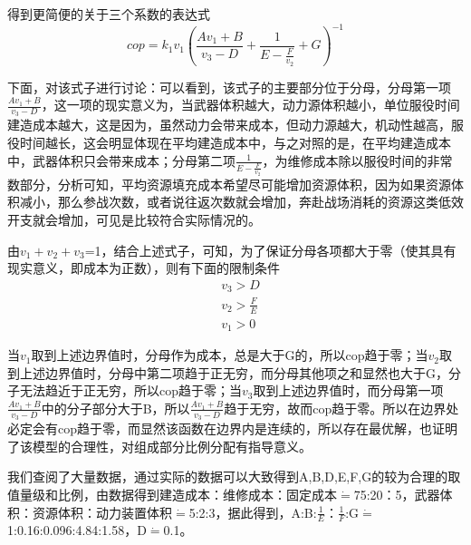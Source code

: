 \documentclass[UTF8]{mcmthesis}
\begin{document}
得到更简便的关于三个系数的表达式
\begin{equation}
cop=k_1v_1\left(\frac{Av_1+B}{v_3-D}+\frac{1}{E-\frac{F}{v_2}}+G\right)^{-1}
\end{equation}

下面，对该式子进行讨论：可以看到，该式子的主要部分位于分母，分母第一项$\frac{Av_1+B}{v_3-D}$，这一项的现实意义为，当武器体积越大，动力源体积越小，单位服役时间建造成本越大，这是因为，虽然动力会带来成本，但动力源越大，机动性越高，服役时间越长，这会明显体现在平均建造成本中，与之对照的是，在平均建造成本中，武器体积只会带来成本；分母第二项$\frac{1}{E-\frac{F}{v_2}}$，为维修成本除以服役时间的非常数部分，分析可知，平均资源填充成本希望尽可能增加资源体积，因为如果资源体积减小，那么参战次数，或者说往返次数就会增加，奔赴战场消耗的资源这类低效开支就会增加，可见是比较符合实际情况的。

由$v_1+v_2+v_3$=1，结合上述式子，可知，为了保证分母各项都大于零（使其具有现实意义，即成本为正数），则有下面的限制条件
\begin{align*}
&v_3>D\\
&v_2>\frac{F}{E}\\
&v_1>0
\end{align*}

当$v_1$取到上述边界值时，分母作为成本，总是大于G的，所以cop趋于零；当$v_2$取到上述边界值时，分母中第二项趋于正无穷，而分母其他项之和显然也大于G，分子无法趋近于正无穷，所以cop趋于零；当$v_3$取到上述边界值时，而分母第一项$\frac{Av_1+B}{v_3-D}$中的分子部分大于B，所以$\frac{Av_1+B}{v_3-D}$趋于无穷，故而cop趋于零。所以在边界处必定会有cop趋于零，而显然该函数在边界内是连续的，所以存在最优解，也证明了该模型的合理性，对组成部分比例分配有指导意义。

我们查阅了大量数据，通过实际的数据可以大致得到A,B,D,E,F,G的较为合理的取值量级和比例，由数据得到建造成本：维修成本：固定成本$\dot=$75:20：5，武器体积：资源体积：动力装置体积$\dot=$5:2:3，据此得到，A:B:$\frac{1}{E}$：$\frac{1}{F}$:G$\dot=$1:0.16:0.096:4.84:1.58，D$\dot=$0.1。
\end{document}
